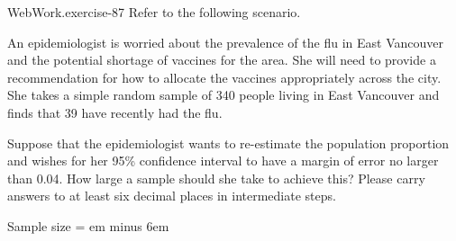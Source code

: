 \documentclass[10pt,]{book}
\newcommand{\fillin}[1]{\leavevmode\leaders\vrule height -1.2pt depth 1.5pt \hskip #1em minus #1em \null}
\numberwithin{equation}{section}
\begin{document}
\begin{inlineexercise}{WebWork.}{exercise-87}%
\hypertarget{p-1301}{}%
Refer to the following scenario.%
\par
\hypertarget{p-1302}{}%
An epidemiologist is worried about the prevalence of the flu in East Vancouver and the potential shortage of vaccines for the area. She will need to provide a recommendation for how to allocate the vaccines appropriately across the city. She takes a simple random sample of 340 people living in East Vancouver and finds that 39 have recently had the flu.%
\par
\hypertarget{p-1303}{}%
Suppose that the epidemiologist wants to re-estimate the population proportion and wishes for her 95\% confidence interval to have a margin of error no larger than 0.04.  How large a sample should she take to achieve this? Please carry answers to at least six decimal places in intermediate steps.%
\par
\hypertarget{p-1304}{}%
Sample size =  \fillin{6}%
\end{inlineexercise}
%
%
%
\typeout{************************************************}
\typeout{************************************************}
%
\end{document}

